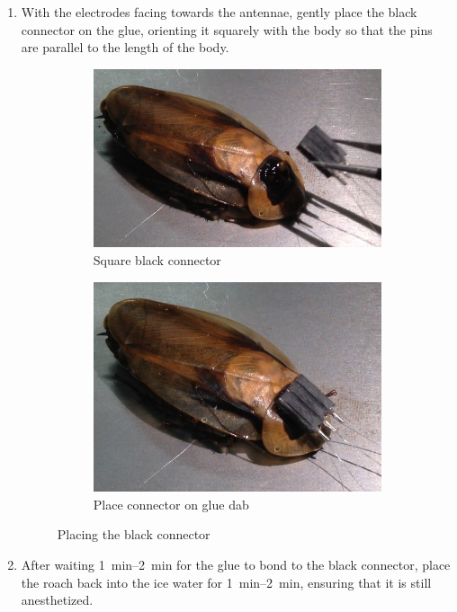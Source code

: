 \begin{enumerate}
\item With the electrodes facing towards the antennae, gently place the black connector on the glue, orienting it squarely with the body so that the pins are parallel to the length of the body.
\begin{figure}[ht!]
\centering
    \begin{subfigure}{.4\textwidth}
    \centering
    \includegraphics[scale=0.3]{Surgery Photos/connector1.JPG}
    \caption{Square black connector}
    \label{fig:connector1}
    \end{subfigure}
    \begin{subfigure}{.4\textwidth}
    \centering
    \includegraphics[scale=0.3]{Surgery Photos/connector2.JPG}
    \caption{Place connector on glue dab}
    \label{fig:connector2}
    \end{subfigure}
\caption{Placing the black connector}
\label{fig:connector}
\end{figure}

\item After waiting \SIrange{1}{2}{\minute} for the glue to bond to the black connector,  place the roach back into the ice water for \SIrange{1}{2}{\minute}, ensuring that it is still anesthetized.
\end{enumerate}






